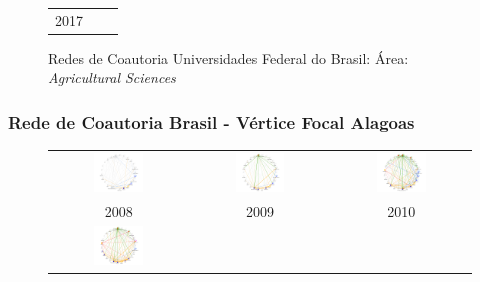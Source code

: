 \begin{figure}[H]
\begin{tabular}{ccc}
		2017 & & \\
	\end{tabular}
	\caption{Redes de Coautoria Universidades Federal do Brasil: Área: \textit{Agricultural Sciences}}
\end{figure}

\subsubsection{Rede de Coautoria Brasil - Vértice Focal Alagoas}

\begin{figure}[H]
	\begin{tabular}{ccc}
		\includegraphics[width=0.38\textwidth]{Imagens/rede-agr-AL-2008.pdf} &   \includegraphics[width=0.38\textwidth]{Imagens/rede-agr-AL-2009.pdf} &
		\includegraphics[width=0.38\textwidth]{Imagens/rede-agr-AL-2010.pdf}\\
		2008 & 2009 & 2010\\[6pt] 
		\includegraphics[width=0.38\textwidth]{Imagens/rede-agr-AL-2011.pdf} &

\end{tabular}
\end{figure}
